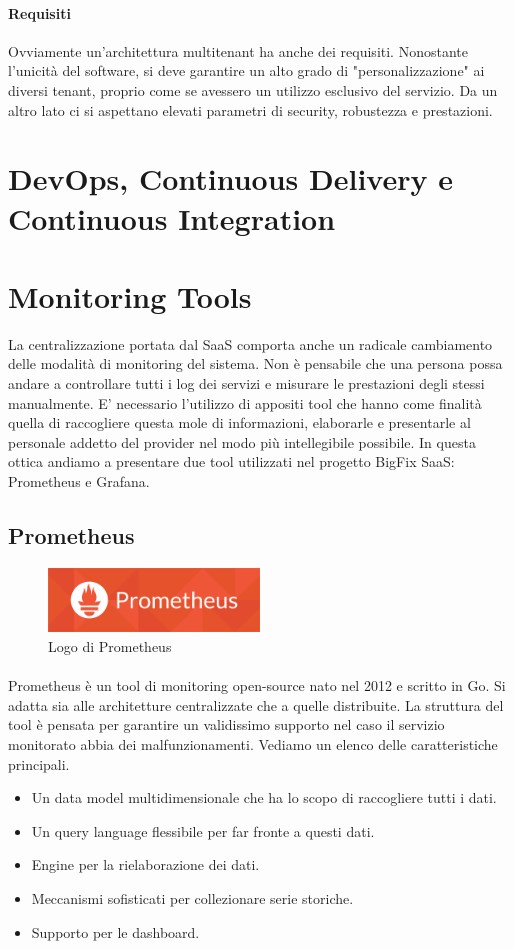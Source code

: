 \paragraph{Requisiti}
Ovviamente un'architettura multitenant ha anche dei requisiti. Nonostante l'unicità del software, si deve garantire un alto grado di "personalizzazione" ai diversi tenant, proprio come se avessero un utilizzo esclusivo del servizio. Da un altro lato ci si aspettano elevati parametri di security, robustezza e prestazioni.

\section{DevOps, Continuous Delivery e Continuous Integration}

\section{Monitoring Tools}
La centralizzazione portata dal SaaS comporta anche un radicale cambiamento delle modalità di monitoring del sistema. Non è pensabile che una persona possa andare a controllare tutti i log dei servizi e misurare le prestazioni degli stessi manualmente. E' necessario l'utilizzo di appositi tool che hanno come finalità quella di raccogliere questa mole di informazioni, elaborarle e presentarle al personale addetto del provider nel modo più intellegibile possibile. In questa ottica andiamo a presentare due tool utilizzati nel progetto BigFix SaaS: Prometheus e Grafana.
\subsection{Prometheus}
\begin{figure}[h!]
	\centering
	\includegraphics[width=0.5\textwidth,keepaspectratio=true]{capitoli/imgs/prometheuslogo.png}
	\caption{Logo di Prometheus}
\end{figure}
\paragraph{}
Prometheus è un tool di monitoring open-source nato nel 2012 e scritto in Go. Si adatta sia alle architetture centralizzate che a quelle distribuite. La struttura del tool è pensata per garantire un validissimo supporto nel caso il servizio monitorato abbia dei malfunzionamenti. Vediamo un elenco delle caratteristiche principali.
\begin{itemize}
	\item Un data model multidimensionale che ha lo scopo di raccogliere tutti i dati.
	\item Un query language flessibile per far fronte a questi dati.
	\item Engine per la rielaborazione dei dati.
	\item Meccanismi sofisticati per collezionare serie storiche.
	\item Supporto per le dashboard.
\end{itemize}
